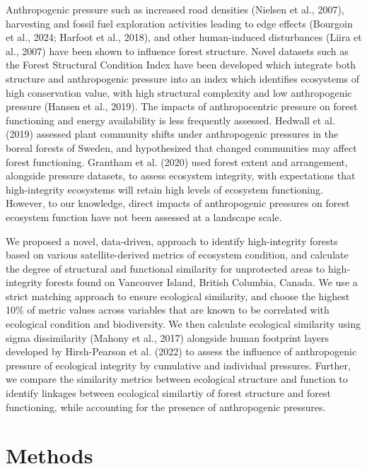 \documentclass[
]{agujournal2019}
\begin{document}
Anthropogenic pressure such as increased road densities (Nielsen et al.,
2007), harvesting and fossil fuel exploration activities leading to edge
effects (Bourgoin et al., 2024; Harfoot et al., 2018), and other
human-induced disturbances (Liira et al., 2007) have been shown to
influence forest structure. Novel datasets such as the Forest Structural
Condition Index have been developed which integrate both structure and
anthropogenic pressure into an index which identifies ecosystems of high
conservation value, with high structural complexity and low
anthropogenic pressure (Hansen et al., 2019). The impacts of
anthropocentric pressure on forest functioning and energy availability
is less frequently assessed. Hedwall et al. (2019) assessed plant
community shifts under anthropogenic pressures in the boreal forests of
Sweden, and hypothesized that changed communities may affect forest
functioning. Grantham et al. (2020) used forest extent and arrangement,
alongside pressure datasets, to assess ecosystem integrity, with
expectations that high-integrity ecosystems will retain high levels of
ecosystem functioning. However, to our knowledge, direct impacts of
anthropogenic pressures on forest ecosystem function have not been
assessed at a landscape scale.

We proposed a novel, data-driven, approach to identify high-integrity
forests based on various satellite-derived metrics of ecosystem
condition, and calculate the degree of structural and functional
similarity for unprotected areas to high-integrity forests found on
Vancouver Island, British Columbia, Canada. We use a strict matching
approach to ensure ecological similarity, and choose the highest 10\% of
metric values across variables that are known to be correlated with
ecological condition and biodiversity. We then calculate ecological
similarity using sigma dissimilarity (Mahony et al., 2017) alongside
human footprint layers developed by Hirsh-Pearson et al. (2022) to
assess the influence of anthropogenic pressure of ecological integrity
by cumulative and individual pressures. Further, we compare the
similarity metrics between ecological structure and function to identify
linkages between ecological similartiy of forest structure and forest
functioning, while accounting for the presence of anthropogenic
pressures.

\section{Methods}\label{methods}
\end{document}
